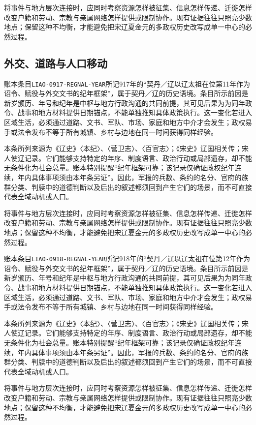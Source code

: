 将事件与地方层次连接时，应同时考察资源怎样被征集、信息怎样传递、迁徙怎样改变户籍和劳动、宗教与亲属网络怎样提供或限制协作。现有证据往往只照亮少数地点；保留这种不均衡，才能避免把宋辽夏金元的多政权历史改写成单一中心的必然过程。

\subsection{外交、道路与人口移动}

账本条目\texttt{LIAO-0917-REGNAL-YEAR}所记917年的“契丹／辽以辽太祖在位第11年作为诏令、赋役与外交文书的纪年框架”，属于契丹／辽的历史语境。条目所示前因是新岁颁历、年号和纪年是中枢与地方行政沟通的共同前提，其可见后果为为同年政令、战事和地方材料提供日期锚点，不能单独推知具体政策执行。这一变化若进入区域生活，必须通过道路、文书、军队、市场、家庭和地方中介才会发生；政权易手或法令发布不等于所有城镇、乡村与边地在同一时间获得同样经验。

本条所列来源为《辽史》〈本纪〉、〈营卫志〉、〈百官志〉；《宋史》辽国相关传；宋人使辽记录。它们能够支持特定的年序、制度语言、政治行动或局部遗存，却不能无条件化为社会总量。账本特别提醒“纪年框架可靠；该记录仅确证政权纪年连续，年内具体事项须由本年条另证”。因此，军报的兵数、条约的名分、官府的族群分类、判牍中的道德判断以及后出的叙述都须回到产生它们的场景，而不可直接代表全域动机或人口。

将事件与地方层次连接时，应同时考察资源怎样被征集、信息怎样传递、迁徙怎样改变户籍和劳动、宗教与亲属网络怎样提供或限制协作。现有证据往往只照亮少数地点；保留这种不均衡，才能避免把宋辽夏金元的多政权历史改写成单一中心的必然过程。

账本条目\texttt{LIAO-0918-REGNAL-YEAR}所记918年的“契丹／辽以辽太祖在位第12年作为诏令、赋役与外交文书的纪年框架”，属于契丹／辽的历史语境。条目所示前因是新岁颁历、年号和纪年是中枢与地方行政沟通的共同前提，其可见后果为为同年政令、战事和地方材料提供日期锚点，不能单独推知具体政策执行。这一变化若进入区域生活，必须通过道路、文书、军队、市场、家庭和地方中介才会发生；政权易手或法令发布不等于所有城镇、乡村与边地在同一时间获得同样经验。

本条所列来源为《辽史》〈本纪〉、〈营卫志〉、〈百官志〉；《宋史》辽国相关传；宋人使辽记录。它们能够支持特定的年序、制度语言、政治行动或局部遗存，却不能无条件化为社会总量。账本特别提醒“纪年框架可靠；该记录仅确证政权纪年连续，年内具体事项须由本年条另证”。因此，军报的兵数、条约的名分、官府的族群分类、判牍中的道德判断以及后出的叙述都须回到产生它们的场景，而不可直接代表全域动机或人口。

将事件与地方层次连接时，应同时考察资源怎样被征集、信息怎样传递、迁徙怎样改变户籍和劳动、宗教与亲属网络怎样提供或限制协作。现有证据往往只照亮少数地点；保留这种不均衡，才能避免把宋辽夏金元的多政权历史改写成单一中心的必然过程。

